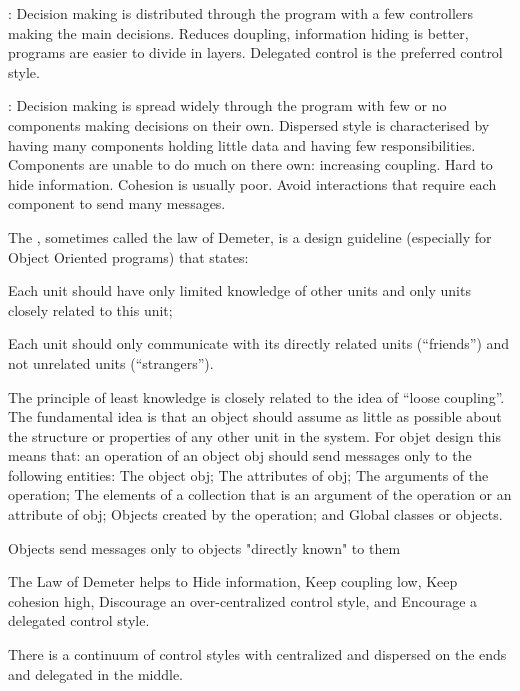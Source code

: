\begin{compactitem}
\begin{compactitem}
\begin{compactitem}
\begin{compactitem}
\item {}:  Decision making is distributed through the program with a few controllers making the main decisions. Reduces doupling, information hiding is better, programs are easier to divide in layers. Delegated control is the preferred control style.
\item {}: Decision making is spread widely through the program with few or no components making decisions on their own. Dispersed style is characterised by having many components holding little data and having few responsibilities. Components are unable to do much on there own: increasing coupling. Hard to hide information. Cohesion is usually poor. Avoid interactions that require each component to send many messages. 
\end{compactitem}

\item The , sometimes called the law of Demeter, is a design guideline (especially for Object Oriented programs) that states:
\begin{compactitem}
\item Each unit should have only limited knowledge of other units and only units closely related to this unit;
\item Each unit should only communicate with its directly related units (“friends”) and not unrelated units (“strangers”).
\end{compactitem}
The  principle of least knowledge is closely related to the idea of “loose coupling”. 
The fundamental idea is that an object should assume as little as possible about the structure or properties of any other unit in the system.
For objet design this means that:  an operation of an object obj should send messages only  to the following entities:
The object obj;
The attributes of obj;
The arguments of the operation;
The elements of a collection that is an argument of the operation or an attribute of obj;
Objects created by the operation; and
Global classes or objects. 

Objects send messages only to objects "directly known" to them

The Law of Demeter helps to
Hide information,
Keep coupling low,
Keep cohesion high,
Discourage an over-centralized control style, and
Encourage a delegated control style.


\item There is a continuum of control styles with centralized and dispersed on the ends and delegated in the middle.


\end{compactitem}
\end{compactitem}
\end{compactitem}
